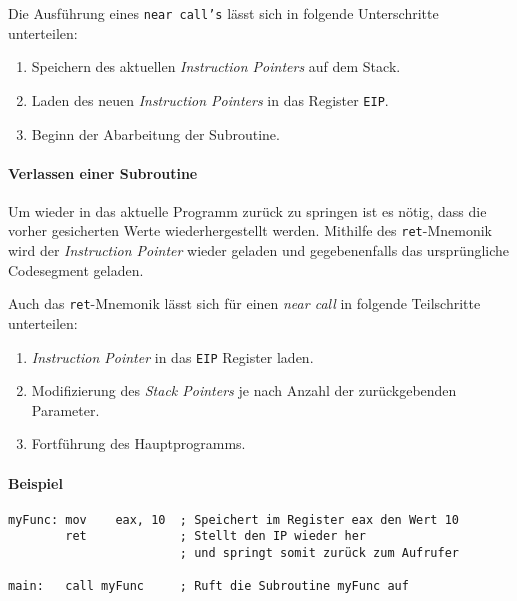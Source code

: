 Die Ausführung eines \texttt{near call's} lässt sich in folgende Unterschritte unterteilen:

\begin{enumerate}
    \item Speichern des aktuellen \textit{Instruction Pointers} auf dem Stack.
    \item Laden des neuen \textit{Instruction Pointers} in das Register \texttt{EIP}.
    \item Beginn der Abarbeitung der Subroutine.
\end{enumerate}

\paragraph{Verlassen einer Subroutine}

Um wieder in das aktuelle Programm zurück zu springen ist es nötig, dass die vorher gesicherten Werte wiederhergestellt werden.
Mithilfe des \texttt{ret}-Mnemonik wird der \textit{Instruction Pointer} wieder geladen und gegebenenfalls das ursprüngliche Codesegment geladen.

Auch das \texttt{ret}-Mnemonik lässt sich für einen \textit{near call} in folgende Teilschritte unterteilen:
\begin{enumerate}
    \item \textit{Instruction Pointer} in das \texttt{EIP} Register laden.
    \item Modifizierung des \textit{Stack Pointers} je nach Anzahl der zurückgebenden Parameter.
    \item Fortführung des Hauptprogramms.
\end{enumerate}

\paragraph{Beispiel\newline}\makebox{}
\begin{lstlisting}
myFunc: mov    eax, 10  ; Speichert im Register eax den Wert 10
        ret             ; Stellt den IP wieder her
                        ; und springt somit zurück zum Aufrufer

main:   call myFunc     ; Ruft die Subroutine myFunc auf
\end{lstlisting}

